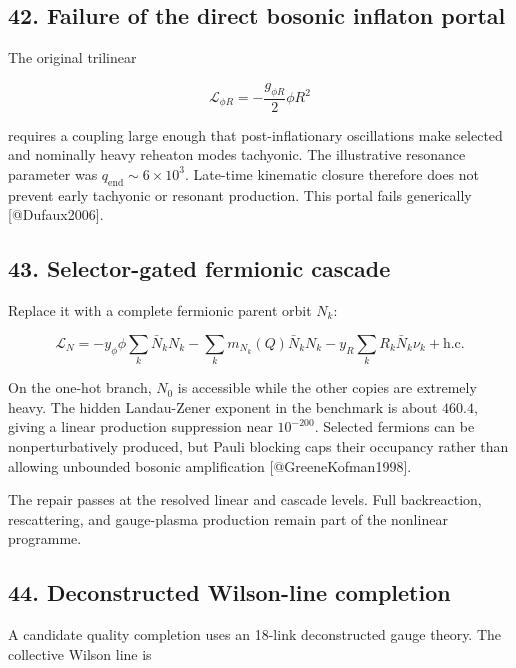 \documentclass[
]{article}
\begin{document}
\hypertarget{failure-of-the-direct-bosonic-inflaton-portal}{%
\subsection{42. Failure of the direct bosonic inflaton
portal}\label{failure-of-the-direct-bosonic-inflaton-portal}}

The original trilinear

\[
\mathcal L_{\phi R}
=-\frac{g_{\phi R}}2\phi R^2
\]

requires a coupling large enough that post-inflationary oscillations
make selected and nominally heavy reheaton modes tachyonic. The
illustrative resonance parameter was
\(q_{\mathrm{end}}\sim6\times10^3\). Late-time kinematic closure
therefore does not prevent early tachyonic or resonant production. This
portal fails generically {[}@Dufaux2006{]}.

\hypertarget{selector-gated-fermionic-cascade}{%
\subsection{43. Selector-gated fermionic
cascade}\label{selector-gated-fermionic-cascade}}

Replace it with a complete fermionic parent orbit \(N_k\):

\[
\mathcal L_N
=-y_\phi\phi\sum_k\bar N_kN_k
-\sum_km_{N_k}(Q)\bar N_kN_k
-y_R\sum_kR_k\bar N_k\nu_k+\mathrm{h.c.}
\]

On the one-hot branch, \(N_0\) is accessible while the other copies are
extremely heavy. The hidden Landau-Zener exponent in the benchmark is
about \(460.4\), giving a linear production suppression near
\(10^{-200}\). Selected fermions can be nonperturbatively produced, but
Pauli blocking caps their occupancy rather than allowing unbounded
bosonic amplification {[}@GreeneKofman1998{]}.

The repair passes at the resolved linear and cascade levels. Full
backreaction, rescattering, and gauge-plasma production remain part of
the nonlinear programme.

\hypertarget{deconstructed-wilson-line-completion}{%
\subsection{44. Deconstructed Wilson-line
completion}\label{deconstructed-wilson-line-completion}}

A candidate quality completion uses an 18-link deconstructed gauge
theory. The collective Wilson line is
\end{document}
